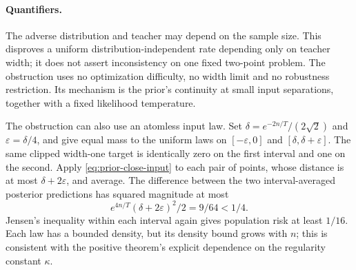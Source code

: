 \paragraph{Quantifiers.}
The adverse distribution and teacher may depend on the sample size.
This disproves a uniform distribution-independent rate depending only
on teacher width; it does not assert inconsistency on one fixed
two-point problem. The obstruction uses no optimization difficulty,
no width limit and no robustness restriction. Its mechanism is the
prior's continuity at small input separations, together with a fixed
likelihood temperature.


The obstruction can also use an atomless input law. Set
$\delta=e^{-2n/T}/(2\sqrt2)$ and $\varepsilon=\delta/4$, and give equal mass to the uniform laws on $[-\varepsilon,0]$ and $[\delta,\delta+\varepsilon]$. The same clipped width-one target is identically zero on the first interval and one on the second. Apply \eqref{eq:prior-close-input} to each pair of points, whose distance is at most $\delta+2\varepsilon$, and average. The difference between the two interval-averaged posterior predictions has squared magnitude at most
\[
 e^{4n/T}(\delta+2\varepsilon)^2/2=9/64<1/4.
\]
Jensen's inequality within each interval again gives population risk at least $1/16$. Each law has a bounded density, but its density bound grows with $n$; this is consistent with the positive theorem's explicit dependence on the regularity constant $\kappa$.
